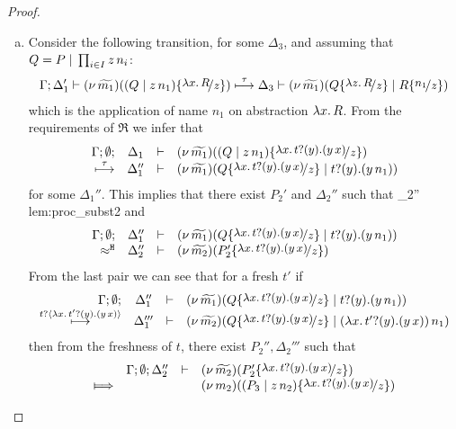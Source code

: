 \begin{proof}
\begin{enumerate}
\begin{enumerate}[(a)]
					\item	Consider the following transition, for some $\Delta_3$, and assuming that $Q = P \;|\; \prod_{i \in I} z\, {n_i}$:
							\begin{eqnarray}
								\horel{\Gamma}{\Delta_1'}{\newsp{\widetilde{m_1}}{(Q \Par \appl{z}{n_1}) \subst{{\abs{x}{R}}}{z} }}
								{\hby{\tau}}
								{\Delta_3}{\newsp{\widetilde{m_1}}{Q \subst{{\abs{z}{R}}}{z} \Par R \subst{n_1}{z}  }}
								\label{lem:proc_subst1}
							\end{eqnarray}
							which is the application of name $n_1$ on abstraction $\lambda x.\,R$.
							From the requirements of $\Re$ we infer that
							\begin{eqnarray*}
								\mhorel{\Gamma}{\Delta_1}{\newsp{\widetilde{m_1}}{(Q \Par \appl{z}{n_1}) \subst{\trvalx{t}}{z} }}
								{\hby{\tau}}
								{\Delta_1''}{}{\newsp{\widetilde{m_1}}{Q \subst{\trvalx{t}}{z} \Par \binp{t}{y} (\appl{y}{n_1})}}
							\end{eqnarray*}
							for some $\Delta_1''$. This implies that there exist $P_2'$ and $\Delta_2''$ such that
								{\Hby{}}
								{\Delta_2''}{}
								{lem:proc_subst2}
							and
							\begin{eqnarray*}
								\mhorel{\Gamma}{\Delta_1''}{\newsp{\widetilde{m_1}}{Q \subst{\trvalx{t}}{z} \Par \binp{t}{y} (\appl{y}{n_1})}}
								{\hwb}
								{\Delta_2''}{}{\newsp{\widetilde{m_2}}{P_2' \subst{\trvalx{t}}{z}}}
							\end{eqnarray*}
							From the last pair we can see that for a fresh $t'$ if
							\begin{eqnarray*}
								\mhorel{\Gamma}{\Delta_1''}{\newsp{\widetilde{m_1}}{Q \subst{\trvalx{t}}{z} \Par \binp{t}{y} (\appl{y}{n_1})}}
								{\hby{\bactinp{t}{\trvalx{t'}}}}
								{\Delta_1'''}{}{\newsp{\widetilde{m_2}}{Q \subst{\trvalx{t}}{z} \Par \appl{(\trvalx{t'})}{n_1}}}
							\end{eqnarray*}
							then from the freshness of $t$, there exist $P_2'', \Delta_2'''$ such that
							\begin{eqnarray}
								\begin{array}{crll}
											& \Gamma; \es; \Delta_2'' &\proves& \newsp{\widetilde{m_2}}{P_2'\subst{\trvalx{t}}{z}}
									\\
									\Hby{}	&	&&	\newsp{m_2}{(P_3 \Par \appl{z}{n_2}) \subst{\trvalx{t}}{z}}

\end{array}
\end{eqnarray}
\end{enumerate}
\end{enumerate}
\end{proof}

